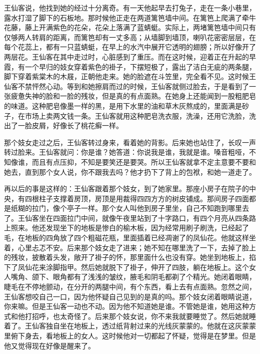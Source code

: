 王仙客说，他找到她的经过十分离奇。有一天他起早去打兔子，走在一条小巷里，露水打湿了脚下的石板地。那时候他正走在两道篱笆墙中间。在篱笆上爬满了牵牛花藤，藤上开满紫色的花朵，花朵上落满了蓝蜻蜓。实际上，两堵篱笆墙中间只有仅够两人转肩的距离，而篱笆却有一丈多高；从墙脚到墙顶，喇叭花密密层层，在每个花蕊上，都有一只蓝蜻蜓，在早上的水汽中展开它透明的翅膀；所以好像开了两层花。王仙客在其中走过时，心脏感到了重压。而在这时候，迎着正在升起的早霞，有一个早归的妓女穿着紫色的褂子，下摆短极了，露出了洁白无疵的两条腿，脚下穿着紫棠木的木屐，正朝他走来。她的脸遮在斗笠里，完全看不见。这时候王仙客不禁怦然心动。等到和她擦肩而过的时候，王仙客就侧过脸去，于是看到了一张疲惫失神的脸和一脸的残妆，但是真的有点面熟。在她身上还能闻到一股粗肥皂的味道。这种肥皂像墨一样的黑，是用下水里的油和草木灰熬成的，里面满是砂子，在市场上卖两文钱一条。王仙客就用这种肥皂洗衣服，洗澡，还用它洗脸，洗出了一脸皮屑，好像长了桃花癣一样。 

那个妓女走过之后，王仙客转过身来，看着她的背影。后来她也站住了，长叹一声转过脸来。王仙客就问：你是谁？她答道：你说我是谁，我就是谁。嗓音粗哑，不知像谁，而且有点压抑，不知是要笑还是要哭。所以王仙客就拿不定主意要不要和她去，直到那个女人说，你不跟我去吗？他才扔下了背上的包袱，和她一道走了。 

再以后的事是这样的：王仙客跟着那个妓女，到了她家里。那座小房子在院子的中央，有四根柱子支撑着房顶，房顶是用裁得四四方方的树皮铺成。那间房子四面都是纸糊的拉门，像个亭子一样。那个女人叫他到房子里坐，自己不知跑到哪里去了。王仙客坐在四面拉门中间，就像午夜里站到了十字路口，有四个月亮从四条路上照来。他还发现坐下的地板是惨白的榆木板，因为经常用刷子刷洗，已经起了毛，在地板的四角放了四个粗磁花瓶，里面插着已经凋谢了的凤仙花。他就这样坐着，心里忐忑不安。后来那个妓女走了进来；她不知在哪里洗了一下，去掉了脸上的残妆，披散着头发，敞开了褂子的怀，那里面什么也没有穿。她坐到地板上，掐下了凤仙花来涂脚指甲。然后她就脱下了褂子，伸开了四肢，躺在地板上。这个女人嘴角、颌下、眼角都有了浅浅的皱纹，腋毛和阴毛都剃了个精光。她闭着眼睛，睫毛在不停地颤动，在分开的两腿中间，有个东西，看上去有点面熟。忽然之间，王仙客想咬自己一口，因为他怀疑自己见到的是真的吗。那个妓女闭着眼睛说道，你来嘛。但是王仙客一动也不动。因为他不知道她是谁。不管她是谁，她用这种方式和他打招呼，也太奇怪了。后来那个妓女说，你不来我就要睡觉了。然后她就睡着了。王仙客独自坐在地板上，透过纸背射过来的光线灰蒙蒙的。他就在这灰蒙蒙里俯下身去，看地板上的女人。这时候他对一切都起了怀疑，觉得是在梦里。但是他又觉得现在好像是醒来了。 

